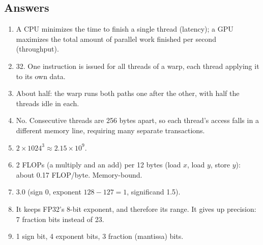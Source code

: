 \subsection*{Answers}
\begin{enumerate}
  \item A CPU minimizes the time to finish a single thread (latency); a GPU maximizes the total amount of parallel work finished per second (throughput).
  \item 32. One instruction is issued for all threads of a warp, each thread applying it to its own data.
  \item About half: the warp runs both paths one after the other, with half the threads idle in each.
  \item No. Consecutive threads are 256 bytes apart, so each thread's access falls in a different memory line, requiring many separate transactions.
  \item $2 \times 1024^3 \approx 2.15\times10^9$.
  \item 2 FLOPs (a multiply and an add) per 12 bytes (load $x$, load $y$, store $y$): about 0.17 FLOP/byte. Memory-bound.
  \item $3.0$ (sign 0, exponent $128 - 127 = 1$, significand 1.5).
  \item It keeps FP32's 8-bit exponent, and therefore its range. It gives up precision: 7 fraction bits instead of 23.
  \item 1 sign bit, 4 exponent bits, 3 fraction (mantissa) bits.
\end{enumerate}
